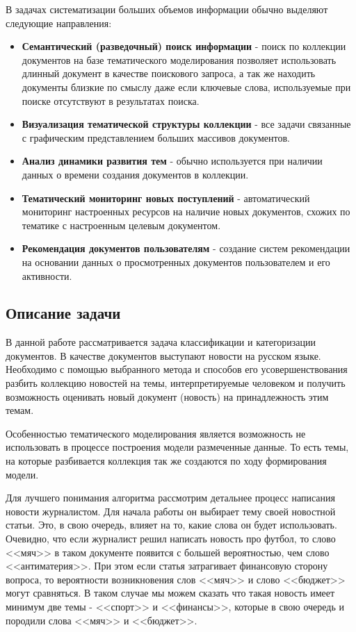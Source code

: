 В задачах систематизации больших объемов информации обычно выделяют следующие направления:

\begin{itemize}
    \item \textbf{Семантический (разведочный) поиск информации} - поиск по коллекции документов на базе тематического моделирования позволяет использовать длинный документ в качестве поискового запроса, а так же находить документы близкие по смыслу даже если ключевые слова, используемые при поиске отсутствуют в результатах поиска.
    \item \textbf{Визуализация тематической структуры коллекции} - все задачи связанные с графическим представлением больших массивов документов.
    \item \textbf{Анализ динамики развития тем} - обычно используется при наличии данных о времени создания документов в коллекции.
    \item \textbf{Тематический мониторинг новых поступлений} - автоматический мониторинг настроенных ресурсов на наличие новых документов, схожих по тематике с настроенным целевым документом.
    \item \textbf{Рекомендация документов пользователям} - создание систем рекомендации на основании данных о просмотренных документов пользователем и его активности.
\end{itemize}

\subsection{Описание задачи}

В данной работе рассматривается задача \todo{}классификации и категоризации документов. В качестве документов выступают новости на русском языке. Необходимо с помощью выбранного метода и способов его усовершенствования разбить коллекцию новостей на темы, интерпретируемые человеком и получить возможность оценивать новый документ (новость) на принадлежность этим темам.

Особенностью тематического моделирования является возможность не использовать в процессе построения модели размеченные данные. То есть темы, на которые разбивается коллекция так же создаются по ходу формирования модели. 

Для лучшего понимания алгоритма рассмотрим детальнее процесс написания новости журналистом. Для начала работы он выбирает тему своей новостной статьи. Это, в свою очередь, влияет на то, какие слова он будет использовать. Очевидно, что если журналист решил написать новость про футбол, то слово <<мяч>> в таком документе появится с большей вероятностью, чем слово <<антиматерия>>. При этом если статья затрагивает финансовую сторону вопроса, то вероятности возникновения слов <<мяч>> и слово <<бюджет>> могут сравняться. В таком случае мы можем сказать что такая новость имеет минимум две темы - <<спорт>> и <<финансы>>, которые в свою очередь и породили слова <<мяч>> и <<бюджет>>. 

